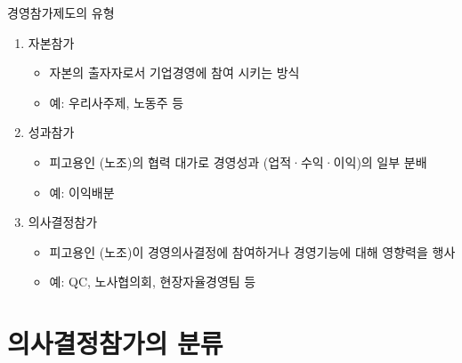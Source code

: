 \documentclass[aspectratio=169,xcolor=dvipsnames,handout]{beamer}
\begin{document}
\begin{frame}{경영참가제도의 유형}
    \begin{enumerate}[<+->]
        \item 자본참가
        \begin{itemize}[<+->]
            \item 자본의 출자자로서 기업경영에 참여 시키는 방식 
            \item 예: 우리사주제, 노동주 등
        \end{itemize}
        \item 성과참가
        \begin{itemize}[<+->]
            \item 피고용인 (노조)의 협력 대가로 경영성과 (업적·수익·이익)의 일부 분배 
            \item 예: 이익배분
        \end{itemize}
        \item 의사결정참가
        \begin{itemize}[<+->]
            \item 피고용인 (노조)이 경영의사결정에 참여하거나 경영기능에 대해 영향력을 행사 
            \item 예: QC, 노사협의회, 현장자율경영팀 등
        \end{itemize}
    \end{enumerate}
\end{frame}

\section{의사결정참가의 분류}
\end{document}
